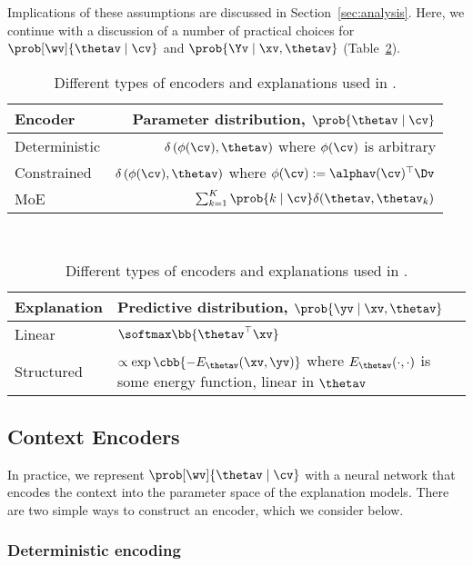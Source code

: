 \documentclass[twoside,11pt]{article}
\begin{document}
Implications of these assumptions are discussed in Section~\ref{sec:analysis}.
Here, we continue with a discussion of a number of practical choices for $\prob[\wv]{\thetav \mid \cv}$ and $\prob{\Yv \mid \xv, \thetav}$ (Table~\ref{tab:cen-components}).


\begin{table}[t!]
\caption{\small Different types of encoders and explanations used in {\CEN}.}
\label{tab:cen-components}
\smallskip
\centering
\scriptsize
\def\arraystretch{1.2}
\begin{tabular}[t]{@{}l|r@{}}
    \toprule
    \textbf{Encoder}    & \textbf{Parameter distribution, $\prob{\thetav \mid \cv}$}  \\
    \midrule
    Deterministic       & $\delta\left(\phi(\cv), \thetav\right)$ where $\phi(\cv)$ is arbitrary \\
    Constrained         & $\delta\left(\phi(\cv), \thetav\right)$ where $\phi(\cv) := \alphav(\cv)^\top \Dv$ \\
    MoE                 & $\sum_{k=1}^K \prob{k \mid \cv} \delta(\thetav, \thetav_k)$ \\
    \bottomrule
\end{tabular}
~
\begin{tabular}[t]{@{}l|>{\raggedleft\arraybackslash}p{5.1cm}@{}}
    \toprule
    \textbf{Explanation} & \textbf{Predictive distribution, $\prob{\yv \mid \xv, \thetav}$}  \\
    \midrule
    Linear                & $\softmax\bb{\thetav^\top \xv}$ \\
    Structured            & $\propto \exp\cbb{-E_{\thetav}(\xv, \yv)}$ where $E_{\thetav}(\cdot, \cdot)$ is some energy function, linear in $\thetav$ \\[0.575ex]
    \bottomrule
\end{tabular}
\end{table} 

\subsection{Context Encoders}\label{sec:encoders}

In practice, we represent $\prob[\wv]{\thetav \mid \cv}$ with a neural network that encodes the context into the parameter space of the explanation models.
There are two simple ways to construct an encoder, which we consider below.


\subsubsection{Deterministic encoding}
\label{sec:det-enc}
\end{document}
